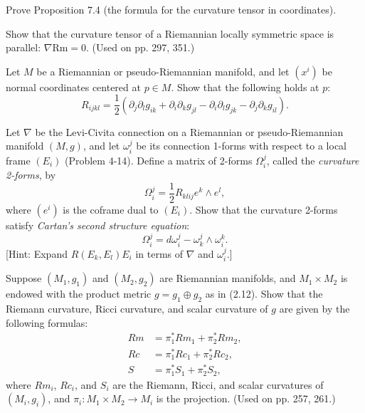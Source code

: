 \begin{exercise}
\label{prob:curvature-coordinate-formula}
Prove Proposition 7.4 (the formula for the curvature tensor in coordinates).
\end{exercise}

\begin{exercise}
\label{prob:symmetric-space-parallel-curvature}
Show that the curvature tensor of a Riemannian locally symmetric space is parallel: $\nabla \text{Rm} = 0$. (Used on pp. 297, 351.)
\end{exercise}

\begin{exercise}
\label{prob:ricci-in-normal-coordinates}
Let $M$ be a Riemannian or pseudo-Riemannian manifold, and let $(x^i)$ be normal coordinates centered at $p \in M$. Show that the following holds at $p$:
\[
R_{ijkl} = \frac{1}{2}\left(\partial_j \partial_l g_{ik} + \partial_i \partial_k g_{jl} - \partial_i \partial_l g_{jk} - \partial_j \partial_k g_{il}\right).
\]
\end{exercise}

\begin{exercise}
\label{prob:cartan-second-structure-equation}
Let $\nabla$ be the Levi-Civita connection on a Riemannian or pseudo-Riemannian manifold $(M,g)$, and let $\omega_i^j$ be its connection 1-forms with respect to a local frame $(E_i)$ (Problem 4-14). Define a matrix of 2-forms $\Omega_i^j$, called the \textit{curvature 2-forms}, by
\[
\Omega_i^j = \frac{1}{2}R_{klij} e^k \wedge e^l,
\]
where $(e^i)$ is the coframe dual to $(E_i)$. Show that the curvature 2-forms satisfy \textit{Cartan's second structure equation}:
\[
\Omega_i^j = d\omega_i^j - \omega_k^j \wedge \omega_i^k.
\]
[Hint: Expand $R(E_k, E_l)E_i$ in terms of $\nabla$ and $\omega_i^j$.]
\end{exercise}

\begin{exercise}
\label{prob:product-metric-curvature}
Suppose $(M_1, g_1)$ and $(M_2, g_2)$ are Riemannian manifolds, and $M_1 \times M_2$ is endowed with the product metric $g = g_1 \oplus g_2$ as in (2.12). Show that the Riemann curvature, Ricci curvature, and scalar curvature of $g$ are given by the following formulas:
\begin{align*}
Rm &= \pi_1^* Rm_1 + \pi_2^* Rm_2, \\
Rc &= \pi_1^* Rc_1 + \pi_2^* Rc_2, \\
S &= \pi_1^* S_1 + \pi_2^* S_2,
\end{align*}
where $Rm_i$, $Rc_i$, and $S_i$ are the Riemann, Ricci, and scalar curvatures of $(M_i, g_i)$, and $\pi_i : M_1 \times M_2 \to M_i$ is the projection. (Used on pp. 257, 261.)
\end{exercise}

